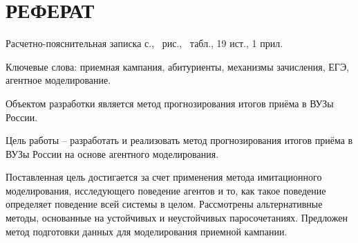 \section*{РЕФЕРАТ}

Расчетно-пояснительная записка \pageref{LastPage} с., \totalfigures\ рис., \totaltables\ табл., 19 ист., 1 прил.

Ключевые слова: приемная кампания, абитуриенты, механизмы зачисления, ЕГЭ, агентное моделирование.


Объектом разработки является метод прогнозирования итогов приёма в ВУЗы России.

Цель работы – разработать и реализовать метод прогнозирования итогов приёма в ВУЗы России на основе агентного моделирования.

Поставленная цель достигается за счет применения метода имитационного моделирования, исследующего поведение агентов и то, как такое поведение определяет поведение всей системы в целом. Рассмотрены альтернативные методы, основанные на устойчивых и неустойчивых паросочетаниях. Предложен метод подготовки данных для моделирования приемной кампании. 

\pagebreak